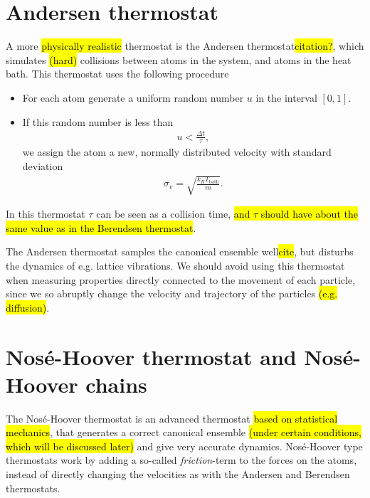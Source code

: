 \section{Andersen thermostat}
A more \hl{physically realistic} thermostat is the Andersen thermostat\hl{citation?}, which simulates \hl{(hard)} collisions between atoms in the system, and atoms in the heat bath. This thermostat uses the following procedure
%
\begin{itemize}
    \item For each atom generate a uniform random number $u$ in the interval $[0,1]$.
    \item If this random number is less than
        \begin{align*}
            u < \frac{\Delta t}{\tau},
        \end{align*}
        we assign the atom a new, normally distributed velocity with standard deviation
        \begin{align*}
            \sigma_v = \sqrt{\frac{k_B T_\text{bath}}{m}}.
        \end{align*}
\end{itemize}
%
In this thermostat $\tau$ can be seen as a collision time, \hl{and $\tau$ should have about the same value as in the Berendsen thermostat}.

The Andersen thermostat samples the canonical ensemble well\hl{cite}, but disturbs the dynamics of e.g. lattice vibrations. We should avoid using this thermostat when measuring properties directly connected to the movement of each particle, since we so abruptly change the velocity and trajectory of the particles \hl{(e.g. diffusion)}.

\section{Nos\'e-Hoover thermostat and Nos\'e-Hoover chains}
The Nos\'e-Hoover thermostat is an advanced thermostat \hl{based on statistical mechanics}, that generates a correct canonical ensemble \hl{(under certain conditions, which will be discussed later)} and give very accurate dynamics\cite[section 6.1]{frenkel2001understanding}. Nosé-Hoover type thermostats work by adding a so-called \emph{friction}-term to the forces on the atoms, instead of directly changing the velocities as with the Andersen and Berendsen thermostats.


